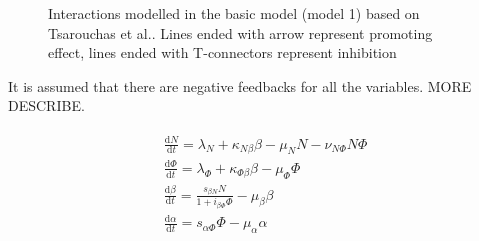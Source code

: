 \documentclass[12pt,a4paper]{report}
\begin{document}
\begin{figure}
    \begin{center}
    \end{center}
    
    \caption[Interactions modelled in the basic model]%
    {Interactions modelled in the basic model (model 1) based on Tsarouchas et al.\cite{ref:Tsarouchas}. Lines ended with arrow represent promoting effect, lines ended with T-connectors represent inhibition} 
    \label{fig:m1}
    
\end{figure}

It is assumed that there are negative feedbacks for all the variables. MORE DESCRIBE.

\begin{align}
    \label{eq:model1}
    \begin{split}
        &\frac{\mathrm{d} N}{\mathrm{d} t}=\lambda_N+\kappa_{N\beta}\beta-\mu_NN-\nu_{N\Phi}N\Phi\\
        &\frac{\mathrm{d} \Phi}{\mathrm{d} t}=\lambda_\Phi+\kappa_{\Phi\beta}\beta-\mu_\Phi\Phi\\
        &\frac{\mathrm{d} \beta}{\mathrm{d} t}=\frac{s_{\beta N}N}{1+i_{\beta\Phi}\Phi}-\mu_\beta\beta\\
        &\frac{\mathrm{d} \alpha}{\mathrm{d} t}=s_{\alpha\Phi}\Phi-\mu_\alpha\alpha
    \end{split}
\end{align}
\end{document}

